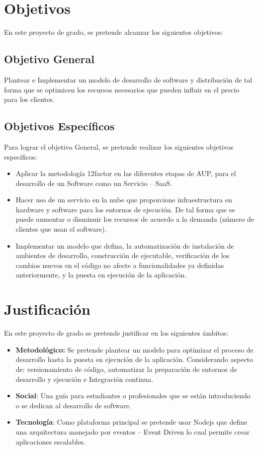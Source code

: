 \section{Objetivos}
\noindent En este proyecto de grado, se pretende alcanzar los siguientes objetivos:

\subsection{Objetivo General}

\noindent Plantear e Implementar un modelo de desarrollo de software y distribución de tal forma que se optimicen los recursos necesarios que pueden influir en el precio para los clientes. 


\subsection{Objetivos Específicos}

\noindent Para lograr el objetivo General, se pretende realizar los siguientes objetivos específicos:
\begin{itemize}
  \item Aplicar la metodología 12factor en las diferentes etapas de AUP, para el desarrollo de un Software como un Servicio – SaaS.
  \item Hacer uso de un servicio en la nube que proporcione  infraestructura en hardware y software para los entornos de ejecución. De tal forma que se puede aumentar o disminuir los recursos de acuerdo a la demanda (número de clientes que usan el software).
  \item Implementar un modelo que defina, la automatización de instalación de ambientes de desarrollo, construcción de ejecutable, verificación de los cambios nuevos en el código no afecte a funcionalidades ya definidas anteriormente, y la puesta en ejecución de la aplicación.
\end{itemize}

\section{Justificación}
\noindent En este proyecto de grado se pretende justificar en los siguientes ámbitos:
\begin{itemize}
  \item \textbf{Metodológico:} Se pretende plantear un modelo para optimizar el proceso de desarrollo hasta la puesta en ejecución de la aplicación. Considerando aspecto de: versionamiento de código, automatizar la preparación de entornos de desarrollo y ejecución e Integración continua.
  \item \textbf{Social}: Una guía para estudiantes o profesionales que se están introduciendo o se dedican al desarrollo de software.
  \item \textbf{Tecnología}: Como plataforma principal se pretende usar Nodejs que define una arquitectura manejado por eventos – Event Driven lo cual permite crear aplicaciones escalables.
\end{itemize}

